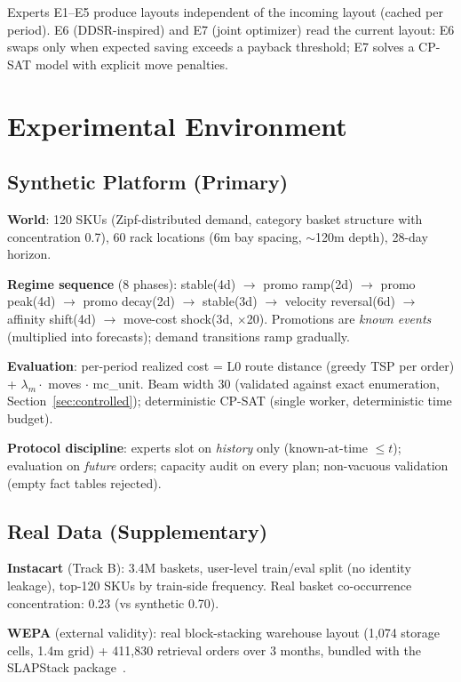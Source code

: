 \documentclass[11pt,a4paper]{article}
\begin{document}
Experts E1--E5 produce layouts independent of the incoming layout
(cached per period). E6 (DDSR-inspired) and E7 (joint optimizer) read the
current layout: E6 swaps only when expected saving exceeds a payback
threshold; E7 solves a CP-SAT model with explicit move penalties.

\section{Experimental Environment}\label{sec:environment}

\subsection{Synthetic Platform (Primary)}

\textbf{World}: 120 SKUs (Zipf-distributed demand, category basket
structure with concentration 0.7), 60 rack locations (6m bay spacing,
$\sim$120m depth), 28-day horizon.

\textbf{Regime sequence} (8 phases): stable(4d) $\to$ promo
ramp(2d) $\to$ promo peak(4d) $\to$ promo decay(2d) $\to$ stable(3d)
$\to$ velocity reversal(6d) $\to$ affinity shift(4d) $\to$ move-cost
shock(3d, $\times$20). Promotions are \emph{known events} (multiplied into
forecasts); demand transitions ramp gradually.

\textbf{Evaluation}: per-period realized cost = L0 route distance (greedy
TSP per order) + $\lambda_m \cdot$ moves $\cdot$ mc\_unit. Beam width 30
(validated against exact enumeration, Section~\ref{sec:controlled});
deterministic CP-SAT (single worker, deterministic time budget).

\textbf{Protocol discipline}: experts slot on \emph{history} only
(known-at-time $\leq t$); evaluation on \emph{future} orders; capacity
audit on every plan; non-vacuous validation (empty fact tables rejected).

\subsection{Real Data (Supplementary)}

\textbf{Instacart} (Track B): 3.4M baskets, user-level train/eval split
(no identity leakage), top-120 SKUs by train-side frequency. Real basket
co-occurrence concentration: 0.23 (vs synthetic 0.70).

\textbf{WEPA} (external validity): real block-stacking warehouse layout
(1{,}074 storage cells, 1.4m grid) + 411{,}830 retrieval orders over 3
months, bundled with the SLAPStack package~\citep{wepastacks2024}.
\end{document}
